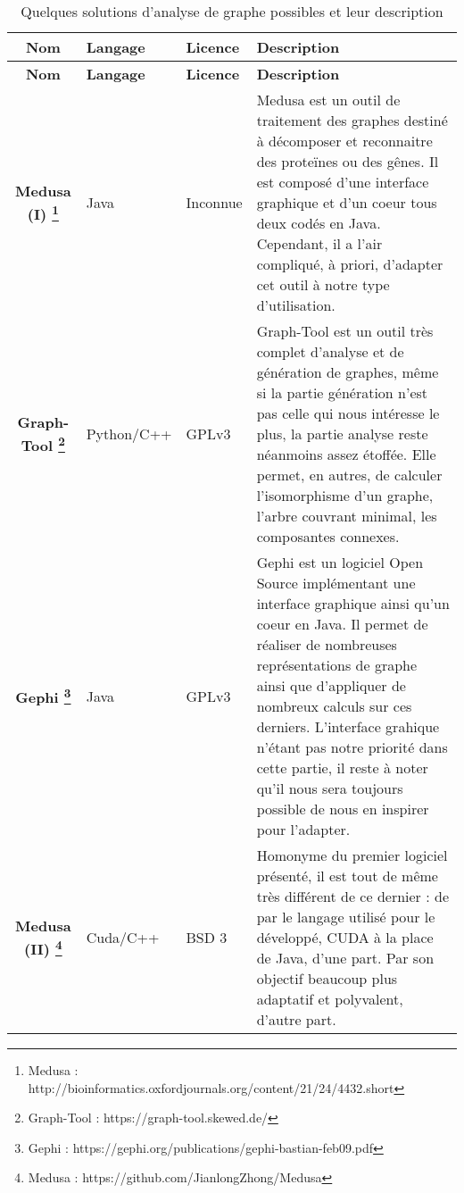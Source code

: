   \begin{longtable}{|c|p{2cm}|p{2cm}|p{8cm}|}
    \caption{Quelques solutions d'analyse de graphe possibles et leur description}\\
    \hline
    \textbf{Nom} & \textbf{Langage} & \textbf{Licence} & \textbf{Description} \\
    \hline \hline
    
    \endfirsthead
    \hline
    \textbf{Nom} & \textbf{Langage} & \textbf{Licence} & \textbf{Description} \\
    \hline \hline
    
    \endhead
	
    \textbf{Medusa (I) \footnote{Medusa :  http://bioinformatics.oxfordjournals.org/content/21/24/4432.short}} & Java & Inconnue & Medusa est un outil de traitement des graphes destiné à décomposer et reconnaitre des proteïnes ou des gênes. Il est composé d'une interface graphique et d'un coeur tous deux codés en Java. Cependant, il a l'air compliqué, à priori, d'adapter cet outil à notre type d'utilisation.\\
    \hline
    \textbf{Graph-Tool \footnote{Graph-Tool : https://graph-tool.skewed.de/}}& Python/C++ & GPLv3 &  Graph-Tool est un outil très complet d'analyse et de génération de graphes, même si la partie génération n'est pas celle qui nous intéresse le plus, la partie analyse reste néanmoins assez étoffée. Elle permet, en autres, de calculer l'isomorphisme d'un graphe, l'arbre couvrant minimal, les composantes connexes. \\
    \hline
    \textbf{Gephi \footnote{Gephi :  https://gephi.org/publications/gephi-bastian-feb09.pdf}}& Java &  GPLv3 & Gephi est un logiciel Open Source implémentant une interface graphique ainsi qu'un coeur en Java. Il permet de réaliser de nombreuses représentations de graphe ainsi que d'appliquer de nombreux calculs sur ces derniers. L'interface grahique n'étant pas notre priorité dans cette partie, il reste à noter qu'il nous sera toujours possible de nous en inspirer pour l'adapter. \\
    \hline
    \textbf{Medusa (II) \footnote{Medusa :  https://github.com/JianlongZhong/Medusa}}& Cuda/C++ &  BSD 3 & Homonyme du premier logiciel présenté, il est tout de même très différent de ce dernier : de par le langage utilisé pour le développé, CUDA à la place de Java, d'une part. Par son objectif beaucoup plus adaptatif et polyvalent, d'autre part. \\
    \hline
  \end{longtable}
  
